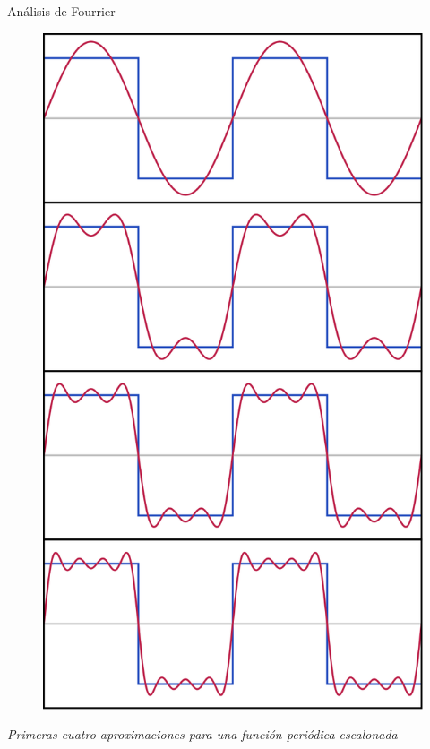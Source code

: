 \begin{myblock}{Análisis de Fourrier}
\begin{multicols}{2}
\begin{figure}[H]
		\centering
		\includegraphics[width=.5\textwidth]{imagenes/imagenes20/T20IM12.png}
	\end{figure}
\end{multicols}
\emph{Primeras cuatro aproximaciones para una función periódica escalonada}
\end{myblock}




 